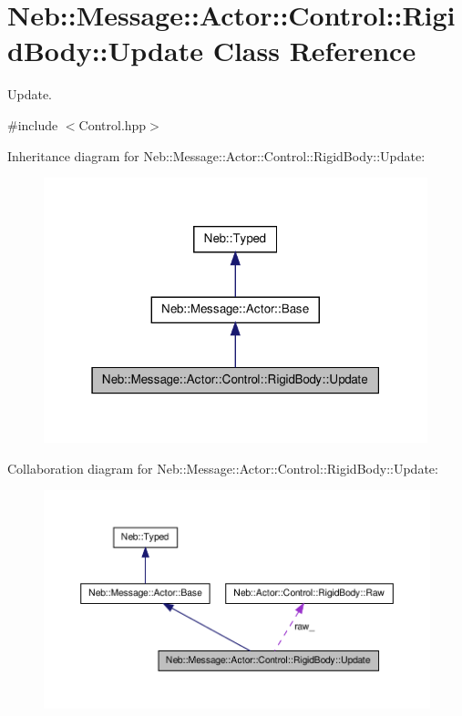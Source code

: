 \hypertarget{classNeb_1_1Message_1_1Actor_1_1Control_1_1RigidBody_1_1Update}{\section{\-Neb\-:\-:\-Message\-:\-:\-Actor\-:\-:\-Control\-:\-:\-Rigid\-Body\-:\-:\-Update \-Class \-Reference}
\label{classNeb_1_1Message_1_1Actor_1_1Control_1_1RigidBody_1_1Update}
}


\-Update.  




{\ttfamily \#include $<$\-Control.\-hpp$>$}



\-Inheritance diagram for \-Neb\-:\-:\-Message\-:\-:\-Actor\-:\-:\-Control\-:\-:\-Rigid\-Body\-:\-:\-Update\-:\nopagebreak
\begin{figure}[H]
\begin{center}
\leavevmode
\includegraphics[width=316pt]{classNeb_1_1Message_1_1Actor_1_1Control_1_1RigidBody_1_1Update__inherit__graph}
\end{center}
\end{figure}


\-Collaboration diagram for \-Neb\-:\-:\-Message\-:\-:\-Actor\-:\-:\-Control\-:\-:\-Rigid\-Body\-:\-:\-Update\-:\nopagebreak
\begin{figure}[H]
\begin{center}
\leavevmode
\includegraphics[width=350pt]{classNeb_1_1Message_1_1Actor_1_1Control_1_1RigidBody_1_1Update__coll__graph}
\end{center}
\end{figure}
